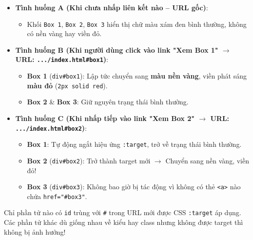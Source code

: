 \documentclass[11pt,oneside]{book}
\newcommand{\codeinline}[1]{\textcolor{accentOrange}{\texttt{#1}}}
\begin{document}
\begin{browserWindow}
\sffamily\small
\begin{itemize}[leftmargin=1.5em, itemsep=3pt, parsep=0pt]
    \item \textbf{Tình huống A (Khi chưa nhấp liên kết nào -- URL gốc)}:
    \begin{itemize}[leftmargin=1.2em, itemsep=1pt]
        \item Khối \codeinline{Box 1}, \codeinline{Box 2}, \codeinline{Box 3} hiển thị chữ màu xám đen bình thường, không có nền vàng hay viền đỏ.
    \end{itemize}
    \item \textbf{Tình huống B (Khi người dùng click vào link "Xem Box 1" $\rightarrow$ URL: \codeinline{.../index.html\#box1})}:
    \begin{itemize}[leftmargin=1.2em, itemsep=1pt]
        \item \textbf{Box 1} (\codeinline{div\#box1}): Lập tức chuyển sang \textbf{màu nền vàng}, viền phát sáng \textbf{màu đỏ} (\codeinline{2px solid red}).
        \item \textbf{Box 2} \& \textbf{Box 3}: Giữ nguyên trạng thái bình thường.
    \end{itemize}
    \item \textbf{Tình huống C (Khi nhấp tiếp vào link "Xem Box 2" $\rightarrow$ URL: \codeinline{.../index.html\#box2})}:
    \begin{itemize}[leftmargin=1.2em, itemsep=1pt]
        \item \textbf{Box 1}: Tự động ngắt hiệu ứng \codeinline{:target}, trở về trạng thái bình thường.
        \item \textbf{Box 2} (\codeinline{div\#box2}): Trở thành target mới $\rightarrow$ Chuyển sang nền vàng, viền đỏ!
        \item \textbf{Box 3} (\codeinline{div\#box3}): Không bao giờ bị tác động vì không có thẻ \codeinline{<a>} nào chứa \codeinline{href="\#box3"}.
    \end{itemize}
\end{itemize}
\end{browserWindow}

\begin{tipBox}
Chỉ phần tử nào có \codeinline{id} trùng với \codeinline{\#} trong URL mới được CSS \codeinline{:target} áp dụng. Các phần tử khác dù giống nhau về kiểu hay class nhưng không được target thì không bị ảnh hưởng!
\end{tipBox}
\end{document}
